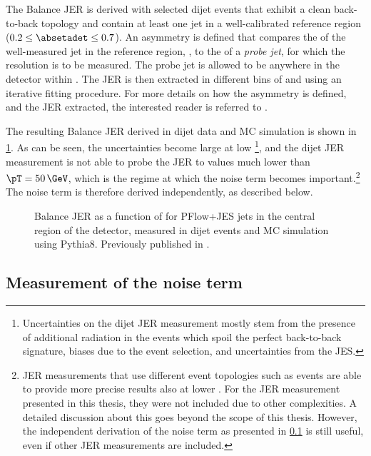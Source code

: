 The Balance JER is derived with selected dijet events that exhibit a clean back-to-back topology and contain at least one jet in a well-calibrated reference region ($0.2 \leq \absetadet \leq 0.7$).
An asymmetry is defined that compares the \pT of the well-measured jet in the reference region, \pTref, to the \pT of a \emph{probe jet}, for which the resolution is to be measured. The probe jet is allowed to be anywhere in the detector within .
The JER is then extracted in different bins of \pTref and \absetadet using an iterative fitting procedure. For more details on how the asymmetry is defined, and the JER extracted, the interested reader is referred to .

The resulting Balance JER derived in dijet data and MC simulation is shown in \cref{fig:insitu-jer-dijet-only}.
As can be seen, the uncertainties become large at low \pT\footnote{Uncertainties on the dijet JER measurement mostly stem from the presence of additional radiation in the events which spoil the perfect back-to-back signature, biases due to the event selection, and uncertainties from the JES.}, and the dijet JER measurement is not able to probe the JER to values much lower than $\pT = 50\,\GeV$, which is the regime at which the noise term becomes important.\footnote{JER measurements that use different event topologies such as \Zjets events are able to provide more precise results also at lower \pT. For the JER measurement presented in this thesis, they were not included due to other complexities. A detailed discussion about this goes beyond the scope of this thesis. However, the independent derivation of the noise term as presented in \cref{sec:noise-term-meas} is still useful, even if other JER measurements are included.}
The noise term is therefore derived independently, as described below.

\FloatBarrier
\begin{figure}[ht]
    \caption[Balance JER as a function of \pT.]{Balance JER as a function of \pT for PFlow+JES jets in the central region of the detector, measured in dijet events and MC simulation using Pythia8. Previously published in .}
    \label{fig:insitu-jer-dijet-only}
\end{figure}


\subsection{Measurement of the noise term}
\label{sec:noise-term-meas}

